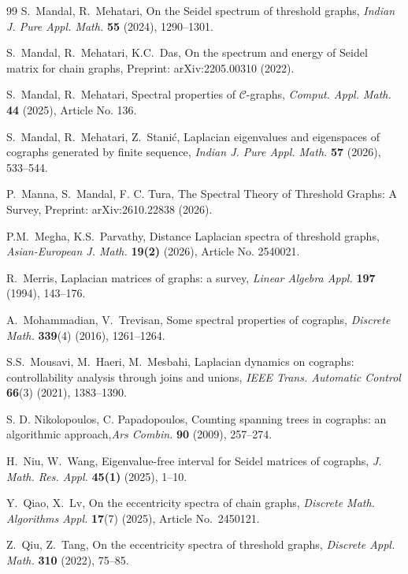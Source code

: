 \documentclass[11pt]{article}
\theoremstyle{plain}
\theoremstyle{definition}
\theoremstyle{remark}
\begin{document}
\begin{thebibliography}{99}
		 S.~Mandal, R.~Mehatari, On the Seidel spectrum of threshold graphs, \emph{Indian J. Pure Appl. Math.} \textbf{55} (2024), 1290--1301.
		
		 S.~Mandal, R.~Mehatari, K.C.~Das, On the spectrum and energy of Seidel matrix for chain graphs, Preprint: arXiv:2205.00310 (2022).
		
		 S.~Mandal, R.~Mehatari, Spectral properties of $\mathcal{C}$-graphs, \emph{Comput. Appl. Math.} \textbf{44} (2025), Article No. 136. 
		
		 S.~Mandal, R.~Mehatari, Z.~Stani\'c, Laplacian eigenvalues and eigenspaces of cographs generated by finite sequence, \emph{Indian J. Pure  Appl. Math.} \textbf{57} (2026), 533--544.
		
		 P.~Manna, S.~Mandal, F. C. Tura, The Spectral Theory of Threshold Graphs: A Survey, Preprint: arXiv:2610.22838 (2026).
		
		 P.M.~Megha, K.S.~Parvathy, Distance Laplacian spectra of threshold graphs, \emph{Asian-European J. Math.} \textbf{19(2)} (2026), Article No. 2540021.
		
		 R.~Merris, Laplacian matrices of graphs: a survey, \emph{Linear Algebra Appl.} \textbf{197} (1994), 143--176.
		
		 A.~Mohammadian, V.~Trevisan, Some spectral properties of cographs, \emph{Discrete Math.} \textbf{339}(4) (2016), 1261--1264.
		
		 S.S.~Mousavi, M.~Haeri, M.~Mesbahi, Laplacian dynamics on cographs: controllability analysis through joins and unions, \emph{IEEE Trans. Automatic Control} \textbf{66}(3) (2021), 1383--1390.
		
		S. D. Nikolopoulos, C. Papadopoulos,
		Counting spanning trees in cographs: an algorithmic approach,\emph{Ars Combin.} \textbf{90} (2009), 257--274.
		
		 H.~Niu, W.~Wang, Eigenvalue-free interval for Seidel matrices of cographs, \emph{J. Math. Res. Appl.} \textbf{45(1)} (2025), 1--10.
		
		 Y.~Qiao, X.~Lv, On the eccentricity spectra of chain graphs, \emph{Discrete Math. Algorithms Appl.} \textbf{17}(7) (2025), Article No.\ 2450121.
		
		 Z.~Qiu, Z.~Tang, On the eccentricity spectra of threshold graphs, \emph{Discrete Appl. Math.} \textbf{310} (2022), 75--85.
		

\end{thebibliography}
\end{document}
